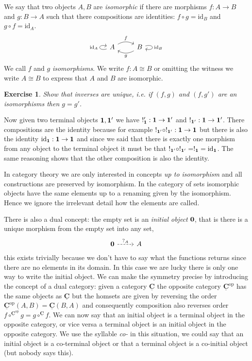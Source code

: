\documentclass{article}
\newcommand{\cat}[1]{\underline{\mathbf{#1}}}
\newcommand{\id}{\mathrm{id}}
\newcommand{\op}{\mathrm{op}}
\newtheorem{exercise}{Exercise}
\begin{document}
We say that two objects $A,B$ are \emph{isomorphic} if there are morphisms $f : A \to B$ and $g : B \to A$ such that there compositions are identities: $f \circ g = \id_B$ and $g \circ f = \id_A$. 
\[\begin{tikzcd}
  A \arrow[r, bend left, "f"]  \arrow[loop left,"\id_A"] & B \arrow[l,bend left ,"g"]\arrow[loop right,"\id_B"] 
\end{tikzcd}\]
We call $f$ and $g$ \emph{isomorphisms}. We write $f : A \cong B$ or omitting the witness we write $A \cong B$ to express that $A$ and $B$ are isomorphic. 
\begin{exercise}
  Show that inverses are unique, i.e. if $(f,g)$ and $(f,g')$ are an isomorphisms then $g = g'$. 
\end{exercise}

Now given two terminal objects $\bf{1},\bf{1'}$ we have $!'_{\bf{1}} : \bf{1} \to \bf{1'}$ and $!_{\bf{1'}} : \bf{1} \to \bf{1'}$. There compositions are the identity because for example $!_{\bf{1'}} \circ !_{\bf{1'}} : \bf{1} \to \bf{1}$ but there is also the identity $\id_{\bf{1}} : \bf{1} \to \bf{1}$ and since we said that there is exactly one morphism from any object to the terminal object it must be that $!_{\bf{1'}} \circ !_{\bf{1'}} = !_{\bf{1}} = \id_{\bf{1}}$. The same reasoning shows that the other composition is also the identity.

In category theory we are only interested in concepts \emph{up to isomorphism} and all constructions are preserved by isomorphism. In the category of sets isomorphic objects have the same elements up to a renaming given by the isomorphism. Hence we ignore the irrelevant detail how the elements are called.

There is also a dual concept: the empty set is an \emph{initial object} $\bf{0}$, that is there is a unique morphism from the empty set into any set, 
\[\begin{tikzcd}
  \bf{0} \arrow[r, dashrightarrow, "?_A"] & A
\end{tikzcd}\]
this exists trivially because we don't have to say what the functions returns since there are no elements in its domain. In this case we are lucky there is only one way to write the initial object. We can make the symmetry precise by introducing the concept of a dual category: given a category $\cat{C}$ the opposite category $\cat{C}^\op$ has the same objects as $\cat{C}$ but the homsets are given by reversing the order $\cat{C}^\op(A,B) = \cat{C}(B,A)$ and consequently composition also reverses order $f \circ^{\cat{C}^\op} g = g \circ^{\cat{C}} f$. We can now say that an initial object is a terminal object in the opposite category, or vice versa a terminal object is an initial object in the opposite 
category. We use the syllable \emph{co-} in this situation, we could say that an initial object is a co-terminal object or that a terminal object is a co-initial object (but nobody says this).
\end{document}
